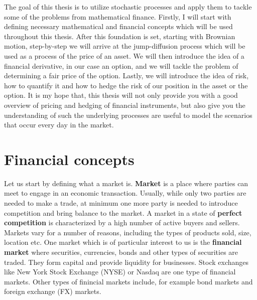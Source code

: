 \documentclass[times, utf8, diplomski]{fer}
\begin{document}
The goal of this thesis is to utilize stochastic processes and apply them to tackle some of the problems from mathematical finance. Firstly, I will start with defining necessary mathematical and financial concepts which will be used throughout this thesis. After this foundation is set, starting with Brownian motion, step-by-step we will arrive at the jump-diffusion process which will be used as a process of the price of an asset. We will then introduce the idea of a financial derivative, in our case an option, and we will tackle the problem of determining a fair price of the option. Lastly, we will introduce the idea of risk, how to quantify it and how to hedge the risk of our position in the asset or the option. It is my hope that, this thesis will not only provide you with a good overview of pricing and hedging of financial instruments, but also give you the understanding of such the underlying processes are useful to model the scenarios that occur every day in the market.

\chapter{Financial concepts}
Let us start by defining what a market is. \textbf{Market} is a place where parties can meet to engage in an economic transaction. Usually, while only two parties are needed to make a trade, at minimum one more party is needed to introduce competition and bring balance to the market. A market in a state of \textbf{perfect competition} is characterized by a high number of active buyers and sellers. Markets vary for a number of reasons, including the types of products sold, size, location etc. One market which is of particular interest to us is the \textbf{financial market} where securities, currencies, bonds and other types of securities are traded. They form capital and provide liquidity for businesses. Stock exchanges like New York Stock Exchange (NYSE) or Nasdaq are one type of financial markets. Other types of finincial markets include, for example bond markets and foreign exchange (FX) markets. 
\end{document}
